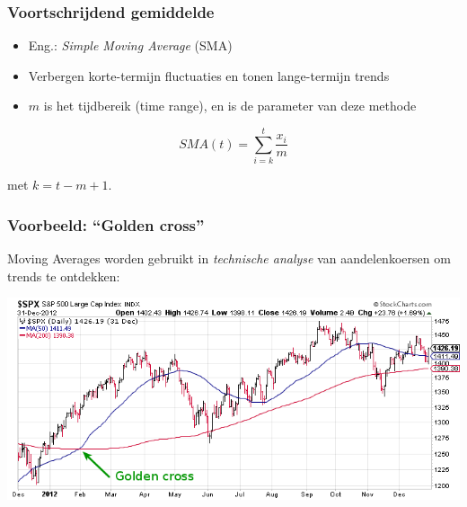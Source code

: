 \documentclass{beamer}
\begin{document}
\begin{frame}
  \frametitle{Voortschrijdend gemiddelde}


  \begin{itemize}
    \item Eng.: \emph{Simple Moving Average} (SMA)
    \item Verbergen korte-termijn fluctuaties en tonen lange-termijn trends
    \item $m$ is het tijdbereik (time range), en is de parameter van deze methode
  \end{itemize}

  \begin{equation}
    SMA(t) = \sum_{i=k}^{t} \frac{x_{i}}{m}
    \label{eq:movingAverage}
  \end{equation}

  met $k = t - m + 1$.
\end{frame}

\begin{frame}
  \frametitle{Voorbeeld: ``Golden cross''}

  Moving Averages worden gebruikt in \emph{technische analyse} van aandelenkoersen om trends te ontdekken:

  \begin{center}
    \includegraphics[width=\textwidth]{img/tijdreeks-golden-cross}
  \end{center}
\end{frame}
\end{document}

